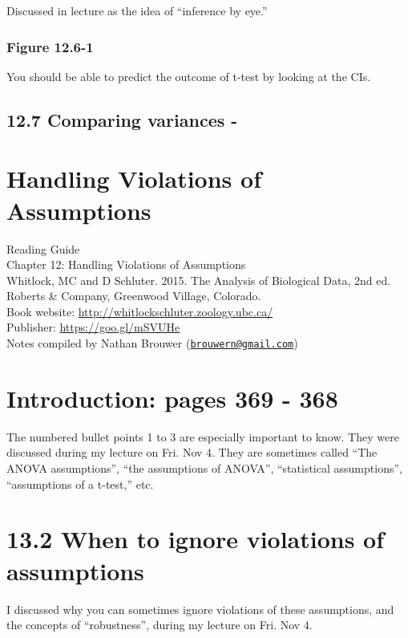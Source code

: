 \documentclass[]{book}
\theoremstyle{definition}
\theoremstyle{definition}
\theoremstyle{definition}
\theoremstyle{remark}
\begin{document}
Discussed in lecture as the idea of ``inference by eye.''

\subsubsection{Figure 12.6-1}\label{figure-12.6-1}

You should be able to predict the outcome of t-test by looking at the
CIs.

\subsection{12.7 Comparing variances -}\label{comparing-variances--}

\section{Handling Violations of
Assumptions}\label{handling-violations-of-assumptions}

Reading Guide\\
Chapter 12: Handling Violations of Assumptions\\
Whitlock, MC and D Schluter. 2015. The Analysis of Biological Data, 2nd
ed. Roberts \& Company, Greenwood Village, Colorado.\\
Book website: \url{http://whitlockschluter.zoology.ubc.ca/}\\
Publisher: \url{https://goo.gl/mSVUHe}\\
Notes compiled by Nathan Brouwer
(\href{mailto:brouwern@gmail.com}{\nolinkurl{brouwern@gmail.com}})

\section{Introduction: pages 369 -
368}\label{introduction-pages-369---368}

The numbered bullet points 1 to 3 are especially important to know. They
were discussed during my lecture on Fri. Nov 4. They are sometimes
called ``The ANOVA assumptions'', ``the assumptions of ANOVA'',
``statistical assumptions'', ``assumptions of a t-test,'' etc.

\section{13.2 When to ignore violations of
assumptions}\label{when-to-ignore-violations-of-assumptions}

I discussed why you can sometimes ignore violations of these
assumptions, and the concepts of ``robustness'', during my lecture on
Fri. Nov 4.
\end{document}

